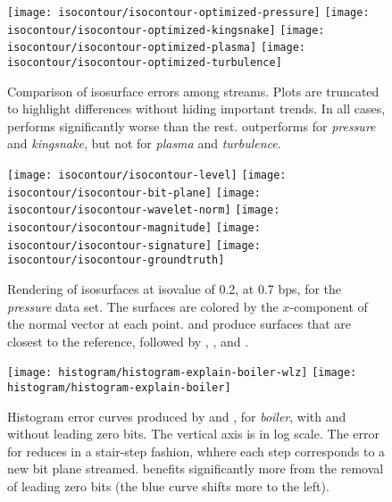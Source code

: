 \begin{figure*}[t]
\centering
{}
{\texttt{[image: isocontour/isocontour-optimized-pressure]}}
{\texttt{[image: isocontour/isocontour-optimized-kingsnake]}}
{\texttt{[image: isocontour/isocontour-optimized-plasma]}}
{\texttt{[image: isocontour/isocontour-optimized-turbulence]}}
\caption{Comparison of isosurface errors among streams. Plots are truncated to highlight differences
without hiding important trends. In all cases, \slvl performs significantly worse than the rest.
\swav outperforms \sbit for \emph{pressure} and \emph{kingsnake}, but not for \emph{plasma} and \emph{turbulence}.}\label{fig:isocontour-plots}
\vspace{1em}

\centering
{}
{\texttt{[image: isocontour/isocontour-level]}}
{\texttt{[image: isocontour/isocontour-bit-plane]}}
{\texttt{[image: isocontour/isocontour-wavelet-norm]}}
{\texttt{[image: isocontour/isocontour-magnitude]}}
{\texttt{[image: isocontour/isocontour-signature]}}
{\texttt{[image: isocontour/isocontour-groundtruth]}}
\caption{Rendering of isosurfaces at isovalue of 0.2, at 0.7 bps, for the \emph{pressure} data set.
The surfaces are colored by the $x$-component of the normal vector at each point. \swav and
\sisg produce surfaces that are closest to the reference, followed by \sbit, \smag, and \slvl.}
\label{fig:isocontour-surfaces-pressure}
\end{figure*}

\begin{figure}[h]
	\centering
	{\texttt{[image: histogram/histogram-explain-boiler-wlz]}}
	{\texttt{[image: histogram/histogram-explain-boiler]}} \caption{Histogram
	error curves produced by \sbit and \slvl, for \emph{boiler}, with and without leading zero bits.
	The vertical axis is in log scale. The error for \sbit reduces in a stair-step fashion, whhere
	each step corresponds to a new bit plane streamed. \sbit benefits significantly more from the
	removal of leading zero bits (the blue curve shifts more to the left).}
	\label{fig:histogram-explain}
	\vspace{-1em}
\end{figure}
